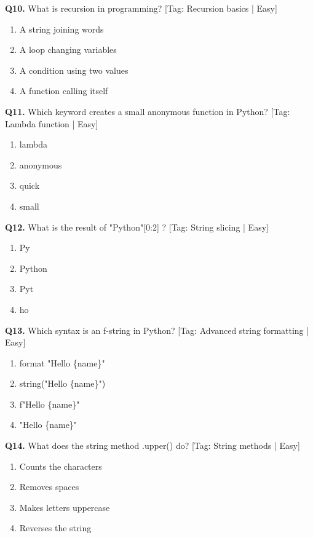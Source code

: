 \vspace{2mm}
\noindent\textbf{Q10.} What is recursion in programming? \hfill [Tag: Recursion basics | Easy]
\begin{enumerate}[label=(\alph*),topsep=2pt,itemsep=1pt,partopsep=0pt,parsep=0pt]
    \item {A string joining words}
    \item {A loop changing variables}
    \item {A condition using two values}
    \item {A function calling itself}
\end{enumerate}
\vspace{2mm}
\noindent\textbf{Q11.} Which keyword creates a small anonymous function in Python? \hfill [Tag: Lambda function | Easy]
\begin{enumerate}[label=(\alph*),topsep=2pt,itemsep=1pt,partopsep=0pt,parsep=0pt]
    \item {lambda}
    \item {anonymous}
    \item {quick}
    \item {small}
\end{enumerate}
\vspace{2mm}
\noindent\textbf{Q12.} What is the result of "Python"[0:2] ? \hfill [Tag: String slicing | Easy]
\begin{enumerate}[label=(\alph*),topsep=2pt,itemsep=1pt,partopsep=0pt,parsep=0pt]
    \item {Py}
    \item {Python}
    \item {Pyt}
    \item {ho}
\end{enumerate}
\vspace{2mm}
\noindent\textbf{Q13.} Which syntax is an f-string in Python? \hfill [Tag: Advanced string formatting | Easy]
\begin{enumerate}[label=(\alph*),topsep=2pt,itemsep=1pt,partopsep=0pt,parsep=0pt]
    \item {format "Hello \{name\}"}
    \item {string("Hello \{name\}")}
    \item {f"Hello \{name\}"}
    \item {"Hello \{name\}"}
\end{enumerate}
\vspace{2mm}
\noindent\textbf{Q14.} What does the string method .upper() do? \hfill [Tag: String methods | Easy]
\begin{enumerate}[label=(\alph*),topsep=2pt,itemsep=1pt,partopsep=0pt,parsep=0pt]
    \item {Counts the characters}
    \item {Removes spaces}
    \item {Makes letters uppercase}
    \item {Reverses the string}
\end{enumerate}
